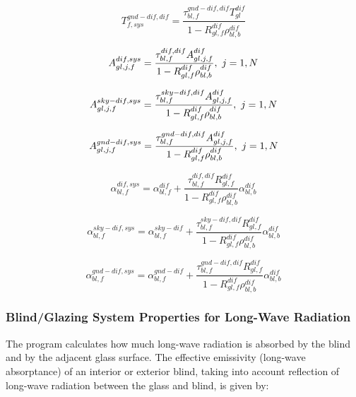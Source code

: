 \begin{equation}
T_{f,sys}^{gnd - dif,dif} = \frac{{\tau_{bl,f}^{gnd - dif,dif}T_{gl}^{dif}}}{{1 - R_{gl,f}^{dif}\rho_{bl,b}^{dif}}}
\end{equation}

\begin{equation}
A_{gl,j,f}^{dif,sys} = \frac{{\tau_{bl,f}^{dif,dif}A_{gl,j,f}^{dif}}}{{1 - R_{gl,f}^{dif}\rho_{bl,b}^{dif}}},{\rm{    }}~j = 1,N
\end{equation}

\begin{equation}
A_{gl,j,f}^{sky - dif,sys} = \frac{{\tau_{bl,f}^{sky - dif,dif}A_{gl,j,f}^{dif}}}{{1 - R_{gl,f}^{dif}\rho_{bl,b}^{dif}}},{\rm{    }}~j = 1,N
\end{equation}

\begin{equation}
A_{gl,j,f}^{gnd - dif,sys} = \frac{{\tau_{bl,f}^{gnd - dif,dif}A_{gl,j,f}^{dif}}}{{1 - R_{gl,f}^{dif}\rho_{bl,b}^{dif}}},{\rm{    }}~j = 1,N
\end{equation}

\begin{equation}
\alpha_{bl,f}^{dif,sys} = \alpha_{bl,f}^{dif} + \frac{{\tau_{bl,f}^{dif,dif}R_{gl,f}^{dif}}}{{1 - R_{gl,f}^{dif}\rho_{bl,b}^{dif}}}\alpha_{bl,b}^{dif}
\end{equation}

\begin{equation}
\alpha_{bl,f}^{sky - dif,sys} = \alpha_{bl,f}^{sky - dif} + \frac{{\tau_{bl,f}^{sky - dif,dif}R_{gl,f}^{dif}}}{{1 - R_{gl,f}^{dif}\rho_{bl,b}^{dif}}}\alpha_{bl,b}^{dif}
\end{equation}

\begin{equation}
\alpha_{bl,f}^{gnd - dif,sys} = \alpha_{bl,f}^{gnd - dif} + \frac{{\tau_{bl,f}^{gnd - dif,dif}R_{gl,f}^{dif}}}{{1 - R_{gl,f}^{dif}\rho_{bl,b}^{dif}}}\alpha_{bl,b}^{dif}
\end{equation}

\subsubsection{Blind/Glazing System Properties for Long-Wave Radiation}\label{blindglazing-system-properties-for-long-wave-radiation}

The program calculates how much long-wave radiation is absorbed by the blind and by the adjacent glass surface. The effective emissivity (long-wave absorptance) of an interior or exterior blind, taking into account reflection of long-wave radiation between the glass and blind, is given by:

